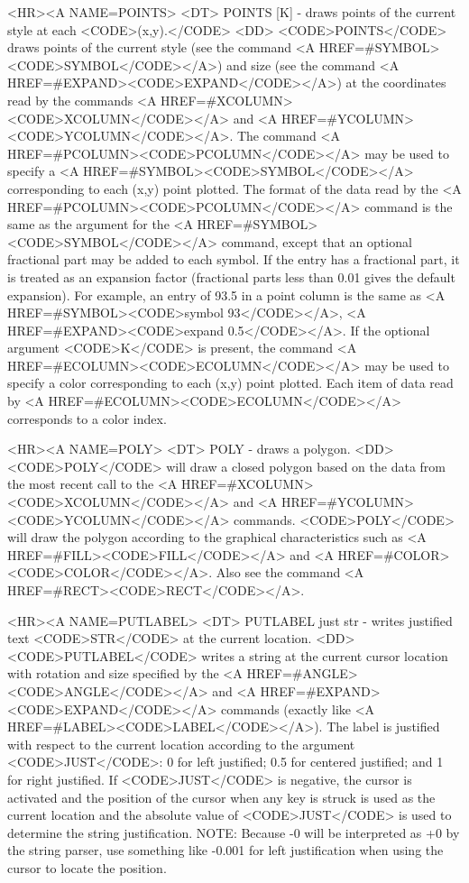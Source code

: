 \begin{rawhtml}
<HR><A NAME=POINTS>
<DT>
POINTS [K] - draws points of the current style at each <CODE>(x,y).</CODE>
<DD>
	<CODE>POINTS</CODE> draws points of the current style (see the command
	<A HREF=#SYMBOL><CODE>SYMBOL</CODE></A>) and size (see the command
	<A HREF=#EXPAND><CODE>EXPAND</CODE></A>) at the coordinates read by the
	commands <A HREF=#XCOLUMN><CODE>XCOLUMN</CODE></A> and
	<A HREF=#YCOLUMN><CODE>YCOLUMN</CODE></A>.
	The command <A HREF=#PCOLUMN><CODE>PCOLUMN</CODE></A> may be used to
	specify a <A HREF=#SYMBOL><CODE>SYMBOL</CODE></A> corresponding to
	each (x,y) point plotted.  The format of the data read by the
	<A HREF=#PCOLUMN><CODE>PCOLUMN</CODE></A> command is the same as the
	argument for the <A HREF=#SYMBOL><CODE>SYMBOL</CODE></A> command,
	except that an optional fractional part may be added to each symbol.
	If the entry has a fractional part, it is treated as an expansion
	factor (fractional parts less than 0.01 gives the default expansion).
	For example, an entry of 93.5 in a point column is the same as
	<A HREF=#SYMBOL><CODE>symbol 93</CODE></A>,
	<A HREF=#EXPAND><CODE>expand 0.5</CODE></A>.
	If the optional argument <CODE>K</CODE> is present, the command
	<A HREF=#ECOLUMN><CODE>ECOLUMN</CODE></A> may be used to specify a
	color corresponding to each (x,y) point plotted.  Each item of
	data read by <A HREF=#ECOLUMN><CODE>ECOLUMN</CODE></A> corresponds
	to a color index.

<HR><A NAME=POLY>
<DT>
POLY - draws a polygon.
<DD>
	<CODE>POLY</CODE> will draw a closed polygon based on the data
	from the most recent call to the
	<A HREF=#XCOLUMN><CODE>XCOLUMN</CODE></A> and
	<A HREF=#YCOLUMN><CODE>YCOLUMN</CODE></A> commands.
	<CODE>POLY</CODE> will draw the polygon according to the
	graphical characteristics such as
	<A HREF=#FILL><CODE>FILL</CODE></A> and
	<A HREF=#COLOR><CODE>COLOR</CODE></A>.
	Also see the command <A HREF=#RECT><CODE>RECT</CODE></A>.

<HR><A NAME=PUTLABEL>
<DT>
PUTLABEL just str - writes justified text <CODE>STR</CODE> at the current location.
<DD>
	<CODE>PUTLABEL</CODE> writes a string at the current cursor
	location with rotation and size specified by the
	<A HREF=#ANGLE><CODE>ANGLE</CODE></A> and
	<A HREF=#EXPAND><CODE>EXPAND</CODE></A> commands
	(exactly like <A HREF=#LABEL><CODE>LABEL</CODE></A>).
	The label is justified with respect to the current
	location according to the argument <CODE>JUST</CODE>: 0 for left
	justified; 0.5 for centered justified; and 1 for right justified.
	If <CODE>JUST</CODE> is negative, the cursor is activated and the
	position of the cursor when any key is struck is used as the
	current location and the absolute value of <CODE>JUST</CODE> is
	used to determine the string justification.
	NOTE: Because -0 will be interpreted as +0 by the
	string parser, use something like -0.001 for left justification
	when using the cursor to locate the position.


\end{rawhtml}
